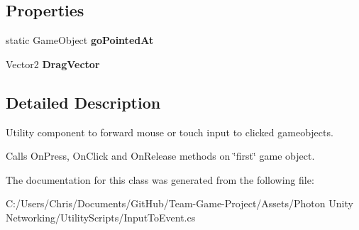 \subsection*{Properties}
\begin{DoxyCompactItemize}
\item 
static Game\+Object {\bfseries go\+Pointed\+At}\hypertarget{class_input_to_event_a174f9bb241e6abae04030a747fc50a51}{}\label{class_input_to_event_a174f9bb241e6abae04030a747fc50a51}

\item 
Vector2 {\bfseries Drag\+Vector}\hypertarget{class_input_to_event_a7a515661f0f9d2367a0e603cbed88592}{}\label{class_input_to_event_a7a515661f0f9d2367a0e603cbed88592}

\end{DoxyCompactItemize}


\subsection{Detailed Description}
Utility component to forward mouse or touch input to clicked gameobjects. 

Calls On\+Press, On\+Click and On\+Release methods on \char`\"{}first\char`\"{} game object. 

The documentation for this class was generated from the following file\+:\begin{DoxyCompactItemize}
\item 
C\+:/\+Users/\+Chris/\+Documents/\+Git\+Hub/\+Team-\/\+Game-\/\+Project/\+Assets/\+Photon Unity Networking/\+Utility\+Scripts/Input\+To\+Event.\+cs\end{DoxyCompactItemize}
